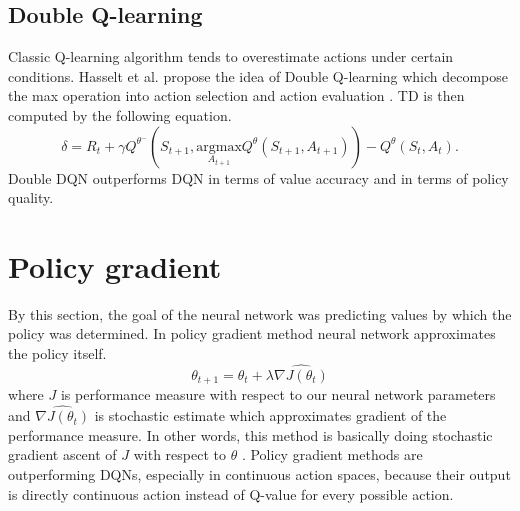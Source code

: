 \subsection{Double Q-learning}
Classic Q-learning algorithm tends to overestimate actions under certain conditions. Hasselt et al. propose the idea of Double Q-learning which decompose the max operation into action selection and action evaluation \cite{hasselt2015}. TD is then computed by the following equation.
\begin{equation}
\delta = R_{t} + \gamma Q^{\theta^-}(S_{t+1}, \underset{A_{t+1}}{\text{argmax}}Q^\theta(S_{t+1}, A_{t+1})) - Q^\theta (S_t, A_t).
\end{equation}
Double DQN outperforms DQN in terms of value accuracy and in terms of policy quality.

\clearpage
\section{Policy gradient}
By this section, the goal of the neural network was predicting values by which the policy was determined. In policy gradient method neural network approximates the policy itself. 
\begin{equation}
\theta_{t+1} = \theta_t + \lambda \widehat{\nabla J(\theta_t)}
\end{equation}
where $J$ is performance measure with respect to our neural network parameters and $\widehat{\nabla J(\theta_t)}$ is stochastic estimate which approximates gradient of the performance measure. In other words, this method is basically doing stochastic gradient ascent of $J$ with respect to $\theta$ \cite{sutton1999}. Policy gradient methods are outperforming DQNs, especially in continuous action spaces, because their output is directly continuous action instead of Q-value for every possible action.

